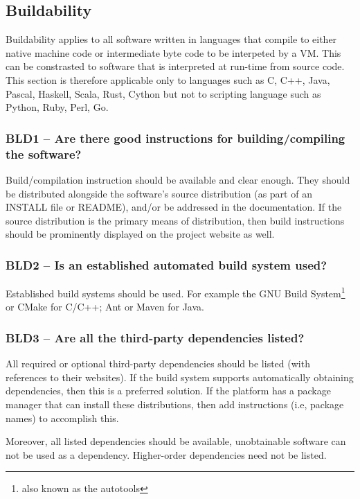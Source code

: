 \documentclass[a4paper,11pt]{article}
\begin{document}
\subsection{Buildability}

Buildability applies to all software written in languages that compile to
either native machine code or intermediate byte code to be interpeted by a VM.
This can be constrasted to software that is interpreted at run-time from source
code. This section is therefore applicable only to languages such as C, C++,
Java, Pascal, Haskell, Scala, Rust, Cython but not to scripting language such
as Python, Ruby, Perl, Go. 


\subsubsection{BLD1 -- Are there good instructions for building/compiling the software?}

Build/compilation instruction should be available and clear enough. They should
be distributed alongside the software's source distribution (as part of an
INSTALL file or README), and/or be addressed in the documentation. If the
source distribution is the primary means of distribution, then build
instructions should be prominently displayed on the project website as well.

\subsubsection{BLD2 -- Is an established automated build system used?}

Established build systems should be used. For example the GNU Build
System\footnote{also known as the autotools} or CMake for C/C++; Ant or Maven
for Java. 

\subsubsection{BLD3 -- Are all the third-party dependencies listed?}

All required or optional third-party dependencies should be listed (with
references to their websites). If the build system supports automatically
obtaining dependencies, then this is a preferred solution. If the platform has
a package manager that can install these distributions, then add instructions
(i.e, package names) to accomplish this.

Moreover, all listed dependencies should be available, unobtainable software
can not be used as a dependency. Higher-order dependencies need not be listed.
\end{document}
